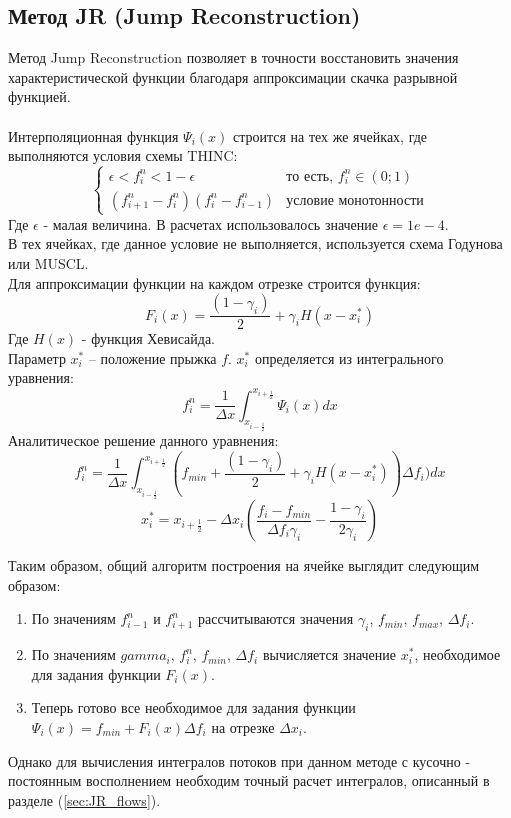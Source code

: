 \documentclass[12pt,a4paper]{article}
\begin{document}
\subsection{Метод JR (Jump Reconstruction)}
Метод Jump Reconstruction позволяет в точности восстановить значения характеристической функции благодаря аппроксимации скачка разрывной функцией.
\\
\medskip
\\
Интерполяционная функция $\Psi_i(x)$ строится на тех же ячейках, где выполняются условия схемы THINC:
\[
\begin{cases}
\epsilon<f_i^n<1-\epsilon & \text{то есть, }f_i^n\in(0; 1)
\\
(f_{i+1}^n-f_i^n)(f_i^n-f_{i-1}^n) & \text{условие монотонности}
\end{cases}
\]
Где $\epsilon$ - малая величина. В расчетах использовалось значение $\epsilon=1e-4$.\\
В тех ячейках, где данное условие не выполняется, используется схема Годунова или MUSCL.\\
Для аппроксимации функции  на каждом  отрезке строится функция:
\[
F_i(x)=\frac{(1-\gamma_i)}{2}+\gamma_iH(x-x_i^*)
\]
Где $H(x)$ - функция Хевисайда.\\
Параметр $x_i^*$ – положение прыжка $f$.
$x_i^*$ определяется из интегрального уравнения:
\[
f_i^n=\frac{1}{\Delta x}\int_{x_{i-\frac{1}{2}}}^{x_{i+\frac{1}{2}}}\Psi_i(x)dx
\]
Аналитическое решение данного уравнения:
\[
f_i^n=\frac{1}{\Delta x}\int_{x_{i-\frac{1}{2}}}^{x_{i+\frac{1}{2}}}(f_{min}+
\frac{(1-\gamma_i)}{2}+\gamma_iH(x-x_i^*))\Delta f_i)dx
\]
\[
x_i^*=x_{i+\frac{1}{2}} - \Delta x_i(\frac{f_{i}-f_{min}}{\Delta f_i\gamma_i}-\frac{1-\gamma_i}{2\gamma_i})
\]

Таким образом, общий алгоритм построения  на ячейке выглядит следующим образом:
\begin{enumerate}
\item По значениям $f_{i-1}^n$ и $f_{i+1}^n$ рассчитываются значения $\gamma_i$, $f_{min}$, $f_{max}$, $\Delta f_i$.
\item По значениям $gamma_i$, $f_i^n$, $f_{min}$, $\Delta f_i$ вычисляется значение $x_i^*$, необходимое для задания функции $F_i(x)$.
\item Теперь готово все необходимое для задания функции $\Psi_i(x)=f_{min}+F_i(x)\Delta f_i$ на отрезке $\Delta x_i$.
\end{enumerate}
Однако для вычисления интегралов потоков при данном методе с кусочно - постоянным восполнением необходим точный расчет интегралов, описанный в разделе (\ref{sec:JR_flows}).
\end{document}
